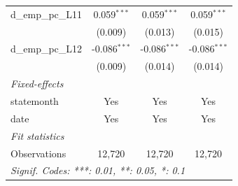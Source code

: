 \begin{tabular}{lccc}
   d\_emp\_pc\_L11     & 0.059$^{***}$  & 0.059$^{***}$  & 0.059$^{***}$\\   
                       & (0.009)        & (0.013)        & (0.015)\\   
   d\_emp\_pc\_L12     & -0.086$^{***}$ & -0.086$^{***}$ & -0.086$^{***}$\\   
                       & (0.009)        & (0.014)        & (0.014)\\   
   \midrule
   \emph{Fixed-effects}\\
   statemonth          & Yes            & Yes            & Yes\\  
   date                & Yes            & Yes            & Yes\\  
   \midrule
   \emph{Fit statistics}\\
   Observations        & 12,720         & 12,720         & 12,720\\  
   \midrule \midrule
   \multicolumn{4}{l}{\emph{Signif. Codes: ***: 0.01, **: 0.05, *: 0.1}}\\
\end{tabular}
\par\endgroup


